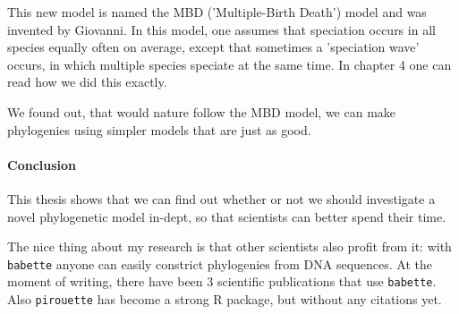 This new model is named the MBD ('Multiple-Birth Death') model
and was invented by Giovanni.
In this model, one assumes that speciation occurs in all species
equally often on average, except that sometimes 
a 'speciation wave' occurs, in which multiple species speciate
at the same time. In chapter 4 one can read how we did this exactly.

We found out, that would nature follow the MBD model, we
can make phylogenies using simpler models that are just as good.

\paragraph{Conclusion}

This thesis shows that we can find out whether or not we should investigate
a novel phylogenetic model in-dept, so that scientists can better
spend their time.

The nice thing about my research is that other scientists also profit
from it: with \verb;babette; anyone can easily constrict phylogenies
from DNA sequences. At the moment of writing, there have been 
3 scientific publications that use \verb;babette;.
Also \verb;pirouette; has become a strong R package, but 
without any citations yet.

